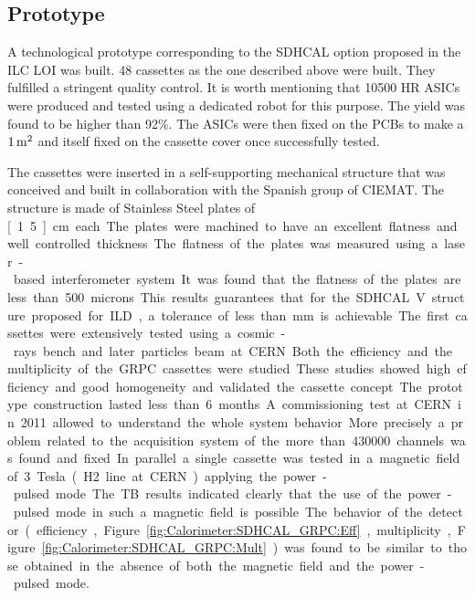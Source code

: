 \subsection{Prototype}

A technological prototype corresponding to the SDHCAL option proposed in the ILC
LOI was built. 48 cassettes as the one described above were built. They
fulfilled a stringent quality control. It is worth mentioning that 10500 HR
ASICs were produced and tested using a dedicated robot for this purpose. The
yield was found to be higher than 92\%. The ASICs were then fixed on the PCBs
to make a $\unit[1]{m^2}$ and itself fixed on the cassette cover once successfully
tested.

The cassettes were inserted in a self-supporting mechanical structure that was
conceived and built in collaboration with the Spanish group of CIEMAT. The
structure is made of Stainless Steel plates of \unit[1.5]{cm} each. The plates were
machined to have an excellent flatness and well controlled thickness. The
flatness of the plates was measured using a laser-based interferometer system.
It was found that the flatness of the plates are less than 500 microns. This
results guarantees that for the SDHCAL V structure proposed for ILD, a tolerance
of less than \unit[1]{mm} is achievable.

The first cassettes were extensively tested using a cosmic-rays bench and later
particles beam at CERN. Both the efficiency and the multiplicity of the GRPC
cassettes were studied. These studies showed high efficiency and good
homogeneity and validated the cassette concept.

The prototype construction lasted less than 6 months. A commissioning test at
CERN in 2011 allowed to understand the whole system behavior. More precisely a
problem related to the acquisition system of the more than 430000 channels was
found and fixed.

In parallel a single cassette was tested in a magnetic field of 3 Tesla (H2 line
at CERN) applying the power-pulsed mode. The TB results indicated clearly that
the use of the power-pulsed mode in such a magnetic field is possible. The
behavior of the detector (efficiency, Figure~\ref{fig:Calorimeter:SDHCAL_GRPC:Eff}, multiplicity, Figure~\ref{fig:Calorimeter:SDHCAL_GRPC:Mult}) was found to be similar to
those obtained in the absence of both the magnetic field and the power-pulsed
mode.


